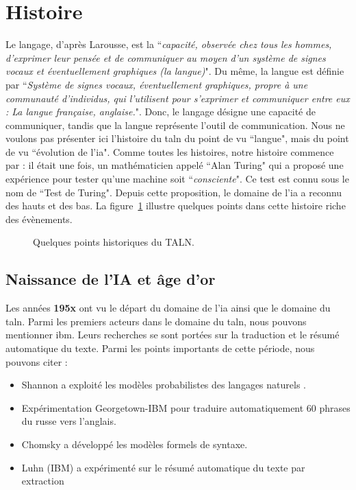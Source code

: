 \documentclass{KodeBook}
\begin{document}
\section{Histoire}

Le langage, d'après Larousse, est la ``\textit{capacité, observée chez tous les hommes, d'exprimer leur pensée et de communiquer au moyen d'un système de signes vocaux et éventuellement graphiques (la langue)}".
Du même, la langue est définie par ``\textit{Système de signes vocaux, éventuellement graphiques, propre à une communauté d'individus, qui l'utilisent pour s'exprimer et communiquer entre eux : La langue française, anglaise.}". 
Donc, le langage désigne une capacité de communiquer, tandis que la langue représente l'outil de communication. 
Nous ne voulons pas présenter ici l'histoire du \ac{taln} du point de vu ``langue", mais du point de vu ``évolution de l'\ac{ia}".
Comme toutes les histoires, notre histoire commence par : il était une fois, un mathématicien appelé ``Alan Turing" qui a proposé une expérience pour tester qu'une machine soit ``\textit{consciente}". 
Ce test est connu sous le nom de ``Test de Turing". 
Depuis cette proposition, le domaine de l'\ac{ia} a reconnu des hauts et des bas.
La figure~\ref{fig:histoire} illustre quelques points dans cette histoire riche des évènements.

\begin{figure}[!ht]
	\centering
	\caption{Quelques points historiques du TALN. \label{fig:histoire}}
\end{figure}

\subsection{Naissance de l'IA et âge d'or}

Les années \textbf{195x} ont vu le départ du domaine de  l'\ac{ia} ainsi que le domaine du \ac{taln}.
Parmi les premiers acteurs dans le domaine du \ac{taln}, nous pouvons mentionner \ac{ibm}. 
Leurs recherches se sont portées sur la traduction et le résumé automatique du texte.
Parmi les points importants de cette période, nous pouvons citer :
\begin{itemize}
	\item {} Shannon a exploité les modèles probabilistes des langages naturels \cite{1951-shannon}.
	\item {} Expérimentation Georgetown-IBM pour traduire automatiquement 60 phrases du russe vers l'anglais.
	\item {} Chomsky a développé les modèles formels de syntaxe.
	\item {} Luhn (IBM) a expérimenté sur le résumé automatique du texte par extraction \cite{1958-luhn}
\end{itemize}
\end{document}

